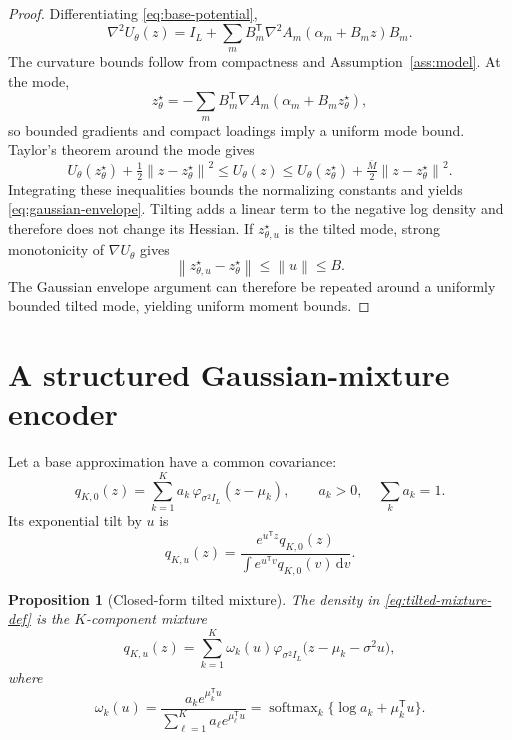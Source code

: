 \documentclass[11pt]{article}
\newtheorem{proposition}[theorem]{Proposition}
\theoremstyle{definition}
\newcommand{\dd}{\,\mathrm d}
\newcommand{\trans}{\mathsf T}
\newcommand{\norm}[1]{\left\lVert #1\right\rVert}
\begin{document}
\begin{proof}
Differentiating \cref{eq:base-potential},
\[
\nabla^2U_\theta(z)
=I_L+\sum_m B_m^{\trans}\nabla^2A_m(\alpha_m+B_mz)B_m.
\]
The curvature bounds follow from compactness and Assumption~\ref{ass:model}. At the mode,
\[
z_\theta^\star
=-\sum_mB_m^{\trans}\nabla A_m(\alpha_m+B_mz_\theta^\star),
\]
so bounded gradients and compact loadings imply a uniform mode bound. Taylor's theorem around the mode gives
\[
U_\theta(z_\theta^\star)+\tfrac12\norm{z-z_\theta^\star}^2
\le U_\theta(z)
\le U_\theta(z_\theta^\star)+\tfrac{\overline M}{2}\norm{z-z_\theta^\star}^2.
\]
Integrating these inequalities bounds the normalizing constants and yields \cref{eq:gaussian-envelope}. Tilting adds a linear term to the negative log density and therefore does not change its Hessian. If $z_{\theta,u}^\star$ is the tilted mode, strong monotonicity of $\nabla U_\theta$ gives
\[
\norm{z_{\theta,u}^\star-z_\theta^\star}\le\norm u\le B.
\]
The Gaussian envelope argument can therefore be repeated around a uniformly bounded tilted mode, yielding uniform moment bounds.
\end{proof}

\section{A structured Gaussian-mixture encoder}
\label{sec:encoder}

Let a base approximation have a common covariance:
\begin{equation}
q_{K,0}(z)
=
\sum_{k=1}^K a_k\,\varphi_{\sigma^2I_L}(z-\mu_k),
\qquad a_k>0,\quad \sum_k a_k=1.
\label{eq:base-mixture}
\end{equation}
Its exponential tilt by $u$ is
\begin{equation}
q_{K,u}(z)
=
\frac{e^{u^{\trans}z}q_{K,0}(z)}
{\int e^{u^{\trans}v}q_{K,0}(v)\dd v}.
\label{eq:tilted-mixture-def}
\end{equation}

\begin{proposition}[Closed-form tilted mixture]
\label{prop:tilted-mixture}
The density in \cref{eq:tilted-mixture-def} is the $K$-component mixture
\begin{equation}
q_{K,u}(z)
=
\sum_{k=1}^K \omega_k(u)
\varphi_{\sigma^2I_L}\bigl(z-\mu_k-\sigma^2u\bigr),
\label{eq:tilted-mixture}
\end{equation}
where
\begin{equation}
\omega_k(u)
=
\frac{a_k e^{\mu_k^{\trans}u}}
{\sum_{\ell=1}^K a_\ell e^{\mu_\ell^{\trans}u}}
=
\operatorname{softmax}_k\{\log a_k+\mu_k^{\trans}u\}.
\label{eq:tilted-weights}
\end{equation}
\end{proposition}
\end{document}

